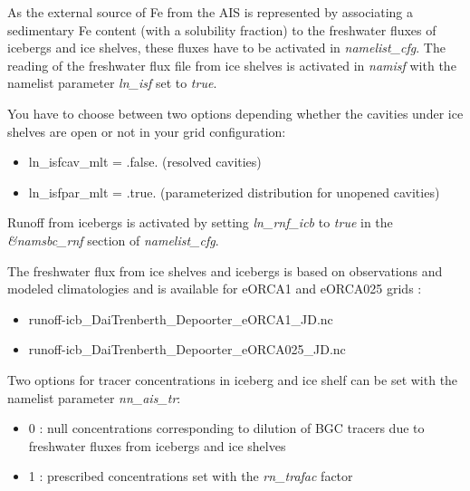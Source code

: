 \documentclass[../main/TOP_manual]{subfiles}
\begin{document}
As the external source of Fe from the AIS is represented by associating  a sedimentary Fe content (with a solubility fraction) to the freshwater fluxes of icebergs and ice shelves, these fluxes have to be activated in \textit{namelist\_cfg}. The reading of the freshwater flux file from ice shelves is activated in \textit{namisf} with the namelist parameter \textit{ln\_isf} set to \textit{true}.

You have to choose between two options depending whether the cavities under ice shelves are open or not in your grid configuration:
\begin{itemize}
	\item ln\_isfcav\_mlt = .false. (resolved cavities)
	\item ln\_isfpar\_mlt = .true. (parameterized distribution for unopened cavities)
\end{itemize}


Runoff from icebergs is activated by setting \textit{ln\_rnf\_icb} to \textit{true} in the \textit{\&namsbc\_rnf} section of \textit{namelist\_cfg}.


The freshwater flux from ice shelves and icebergs is based on observations and modeled climatologies and is available for eORCA1 and eORCA025 grids :
\begin{itemize}
	\item runoff-icb\_DaiTrenberth\_Depoorter\_eORCA1\_JD.nc
	\item runoff-icb\_DaiTrenberth\_Depoorter\_eORCA025\_JD.nc 
\end{itemize}


Two options for tracer concentrations in iceberg and ice shelf can be set with the namelist parameter \textit{nn\_ais\_tr}:
\begin{itemize}
	\item 0 : null concentrations corresponding to dilution of BGC tracers due to freshwater fluxes from icebergs and ice shelves
	\item 1 : prescribed concentrations set with the \textit{rn\_trafac} factor
\end{itemize}
\end{document}
